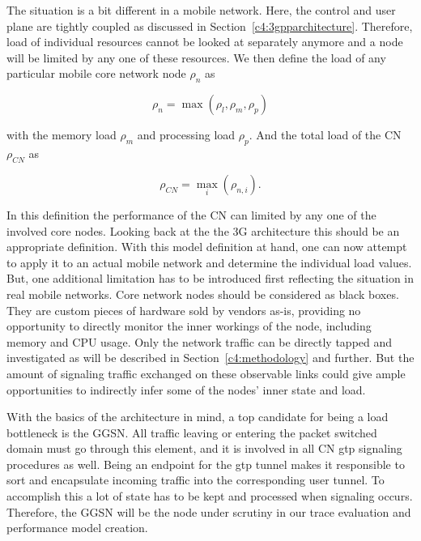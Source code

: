 The situation is a bit different in a mobile network. Here, the control and user plane are tightly coupled as discussed in Section~\ref{c4:3gpparchitecture}.  Therefore, load of individual resources cannot be looked at separately anymore and a node will be limited by any one of these resources. We then define the load of any particular mobile core network node $\rho_{n}$ as

\begin{equation}
\rho_{n} = \max(\rho_{l}, \rho_{m}, \rho_{p})
\end{equation}

with the memory load $\rho_{m}$ and processing load $\rho_{p}$. And the total load of the \gls{CN} $\rho_{CN}$ as

\begin{equation}
\rho_{CN} = \max_{i}(\rho_{n,i})\text{.}
\end{equation}

In this definition the performance of the \gls{CN} can limited by any one of the involved core nodes. Looking back at the the \gls{3G} architecture this should be an appropriate definition. With this model definition at hand, one can now attempt to apply it to an actual mobile network and determine the individual load values. But, one additional limitation has to be introduced first reflecting the situation in real mobile networks. Core network nodes should be considered as black boxes. They are custom pieces of hardware sold by vendors as-is, providing no opportunity to directly monitor the inner workings of the node, including memory and CPU usage. Only the network traffic can be directly tapped and investigated as will be described in Section~\ref{c4:methodology} and further. But the amount of signaling traffic exchanged on these observable links could give ample opportunities to indirectly infer some of the nodes' inner state and load.

With the basics of the architecture in mind, a top candidate for being a load bottleneck is the \gls{GGSN}. All traffic leaving or entering the packet switched domain must go through this element, and it is involved in all \gls{CN} \gls{gtp} signaling procedures as well. Being an endpoint for the \gls{gtp} tunnel makes it responsible to sort and encapsulate incoming traffic into the corresponding user tunnel. To accomplish this a lot of state has to be kept and processed when signaling occurs. Therefore, the \gls{GGSN} will be the node under scrutiny in our trace evaluation and performance model creation.

